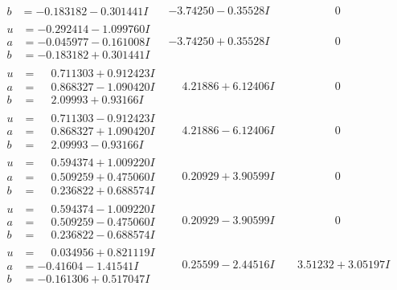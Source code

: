 \documentclass[1p]{elsarticle_modified}
\theoremstyle{definition}
\begin{document}
$$\begin{array}{c|c|c}
\begin{aligned}
b &= -0.183182 - 0.301441 I\end{aligned}
 & -3.74250 - 0.35528 I & \phantom{-0.000000 } 0 \\ \hline\begin{aligned}
u &= -0.292414 - 1.099760 I \\
a &= -0.045977 - 0.161008 I \\
b &= -0.183182 + 0.301441 I\end{aligned}
 & -3.74250 + 0.35528 I & \phantom{-0.000000 } 0 \\ \hline\begin{aligned}
u &= \phantom{-}0.711303 + 0.912423 I \\
a &= \phantom{-}0.868327 - 1.090420 I \\
b &= \phantom{-}2.09993 + 0.93166 I\end{aligned}
 & \phantom{-}4.21886 + 6.12406 I & \phantom{-0.000000 } 0 \\ \hline\begin{aligned}
u &= \phantom{-}0.711303 - 0.912423 I \\
a &= \phantom{-}0.868327 + 1.090420 I \\
b &= \phantom{-}2.09993 - 0.93166 I\end{aligned}
 & \phantom{-}4.21886 - 6.12406 I & \phantom{-0.000000 } 0 \\ \hline\begin{aligned}
u &= \phantom{-}0.594374 + 1.009220 I \\
a &= \phantom{-}0.509259 + 0.475060 I \\
b &= \phantom{-}0.236822 + 0.688574 I\end{aligned}
 & \phantom{-}0.20929 + 3.90599 I & \phantom{-0.000000 } 0 \\ \hline\begin{aligned}
u &= \phantom{-}0.594374 - 1.009220 I \\
a &= \phantom{-}0.509259 - 0.475060 I \\
b &= \phantom{-}0.236822 - 0.688574 I\end{aligned}
 & \phantom{-}0.20929 - 3.90599 I & \phantom{-0.000000 } 0 \\ \hline\begin{aligned}
u &= \phantom{-}0.034956 + 0.821119 I \\
a &= -0.41604 - 1.41541 I \\
b &= -0.161306 + 0.517047 I\end{aligned}
 & \phantom{-}0.25599 - 2.44516 I & \phantom{-}3.51232 + 3.05197 I \\ \hline\begin{aligned}

\end{aligned}
\end{array}$$
\end{document}
